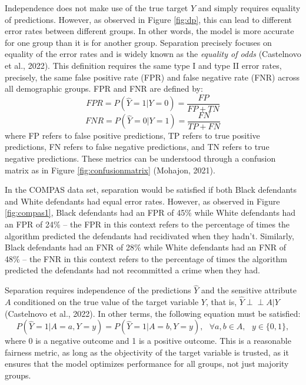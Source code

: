 \documentclass[12pt, twoside]{amherstthesis}
\begin{document}
Independence does not make use of the true target \(Y\) and simply requires equality of predictions. However, as observed in Figure \ref{fig:dp}, this can lead to different error rates between different groups. In other words, the model is more accurate for one group than it is for another group. Separation precisely focuses on equality of the error rates and is widely known as the \emph{equality of odds} (Castelnovo et al., 2022). This definition requires the same type I and type II error rates, precisely, the same false positive rate (FPR) and false negative rate (FNR) across all demographic groups. FPR and FNR are defined by:
\begin{equation}
\label{ch1eq6}
FPR = P(\hat{Y} = 1| Y = 0) = \frac{FP}{FP + TN}
\end{equation}
\begin{equation}
\label{ch1eq7}
FNR = P(\hat{Y} = 0| Y = 1) = \frac{FN}{TP + FN}
\end{equation}
where FP refers to false positive predictions, TP refers to true positive predictions, FN refers to false negative predictions, and TN refers to true negative predictions. These metrics can be understood through a confusion matrix as in Figure \ref{fig:confusionmatrix} (Mohajon, 2021).

In the COMPAS data set, separation would be satisfied if both Black defendants and White defendants had equal error rates. However, as observed in Figure \ref{fig:compas1}, Black defendants had an FPR of 45\% while White defendants had an FPR of 24\% -- the FPR in this context refers to the percentage of times the algorithm predicted the defendants had recidivated when they hadn't. Similarly, Black defendants had an FNR of 28\% while White defendants had an FNR of 48\% -- the FNR in this context refers to the percentage of times the algorithm predicted the defendants had not recommitted a crime when they had.

Separation requires independence of the predictions \(\hat{Y}\) and the sensitive attribute \(A\) conditioned on the true value of the target variable \(Y\), that is, \(\hat{Y} \perp \!\!\! \perp A|Y\) (Castelnovo et al., 2022). In other terms, the following equation must be satisfied:
\begin{equation}
\label{ch1eq8}
P(\hat{Y} = 1 | A = a, Y = y) = P(\hat{Y} = 1 | A = b, Y = y), \text{ } \forall a,b \in A, \text{ } y \in \{ 0, 1 \},
\end{equation}
where 0 is a negative outcome and 1 is a positive outcome. This is a reasonable fairness metric, as long as the objectivity of the target variable is trusted, as it ensures that the model optimizes performance for all groups, not just majority groups.
\end{document}
